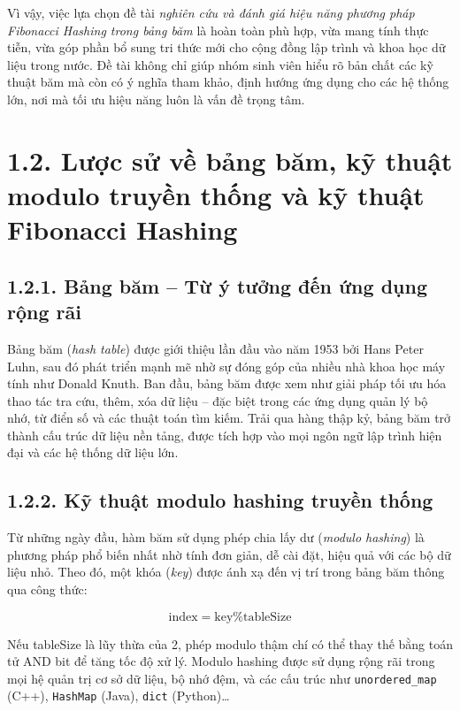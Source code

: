 \documentclass[12pt,a4paper]{report}
\begin{document}
Vì vậy, việc lựa chọn đề tài \textit{nghiên cứu và đánh giá hiệu năng phương pháp Fibonacci Hashing trong bảng băm} là hoàn toàn phù hợp, vừa mang tính thực tiễn, vừa góp phần bổ sung tri thức mới cho cộng đồng lập trình và khoa học dữ liệu trong nước. Đề tài không chỉ giúp nhóm sinh viên hiểu rõ bản chất các kỹ thuật băm mà còn có ý nghĩa tham khảo, định hướng ứng dụng cho các hệ thống lớn, nơi mà tối ưu hiệu năng luôn là vấn đề trọng tâm.



\section*{1.2. Lược sử về bảng băm, kỹ thuật modulo truyền thống và kỹ thuật Fibonacci Hashing}
\subsection*{1.2.1. Bảng băm – Từ ý tưởng đến ứng dụng rộng rãi}
\noindent \indent Bảng băm (\textit{hash table}) được giới thiệu lần đầu vào năm 1953 bởi Hans Peter Luhn, sau đó phát triển mạnh mẽ nhờ sự đóng góp của nhiều nhà khoa học máy tính như Donald Knuth. Ban đầu, bảng băm được xem như giải pháp tối ưu hóa thao tác tra cứu, thêm, xóa dữ liệu – đặc biệt trong các ứng dụng quản lý bộ nhớ, từ điển số và các thuật toán tìm kiếm. Trải qua hàng thập kỷ, bảng băm trở thành cấu trúc dữ liệu nền tảng, được tích hợp vào mọi ngôn ngữ lập trình hiện đại và các hệ thống dữ liệu lớn.

\subsection*{1.2.2. Kỹ thuật modulo hashing truyền thống}
\noindent \indent Từ những ngày đầu, hàm băm sử dụng phép chia lấy dư (\textit{modulo hashing}) là phương pháp phổ biến nhất nhờ tính đơn giản, dễ cài đặt, hiệu quả với các bộ dữ liệu nhỏ. Theo đó, một khóa (\textit{key}) được ánh xạ đến vị trí trong bảng băm thông qua công thức:

\[
\text{index} = \text{key} \% \text{tableSize}
\]

Nếu tableSize là lũy thừa của 2, phép modulo thậm chí có thể thay thế bằng toán tử AND bit để tăng tốc độ xử lý. Modulo hashing được sử dụng rộng rãi trong mọi hệ quản trị cơ sở dữ liệu, bộ nhớ đệm, và các cấu trúc như \texttt{unordered\_map} (C++), \texttt{HashMap} (Java), \texttt{dict} (Python)…
\end{document}
